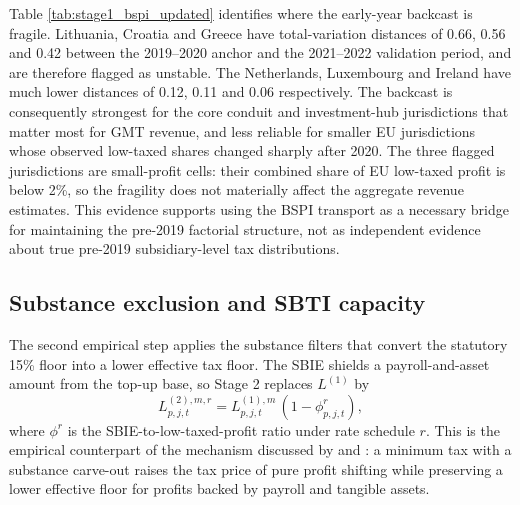 \documentclass[11pt,a4paper]{article}
\begin{document}


Table \ref{tab:stage1_bspi_updated} identifies where the early-year backcast is fragile. Lithuania, Croatia and Greece have total-variation distances of 0.66, 0.56 and 0.42 between the 2019--2020 anchor and the 2021--2022 validation period, and are therefore flagged as unstable. The Netherlands, Luxembourg and Ireland have much lower distances of 0.12, 0.11 and 0.06 respectively. The backcast is consequently strongest for the core conduit and investment-hub jurisdictions that matter most for GMT revenue, and less reliable for smaller EU jurisdictions whose observed low-taxed shares changed sharply after 2020. The three flagged jurisdictions are small-profit cells: their combined share of EU low-taxed profit is below 2\%, so the fragility does not materially affect the aggregate revenue estimates. This evidence supports using the BSPI transport as a necessary bridge for maintaining the pre-2019 factorial structure, not as independent evidence about true pre-2019 subsidiary-level tax distributions.

\subsection{Substance exclusion and SBTI capacity}\label{sec:results_stage2}

The second empirical step applies the substance filters that convert the statutory 15\% floor into a lower effective tax floor. The SBIE shields a payroll-and-asset amount from the top-up base, so Stage 2 replaces $L^{(1)}$ by
\begin{equation}\label{eq:results_stage2_liability}
L_{p,j,t}^{(2),m,r}
= L_{p,j,t}^{(1),m}\,(1-\phi_{p,j,t}^{r}),
\end{equation}
where $\phi^{r}$ is the SBIE-to-low-taxed-profit ratio under rate schedule $r$. This is the empirical counterpart of the mechanism discussed by \citet{devereux2023} and \citet{schjelderup2024}: a minimum tax with a substance carve-out raises the tax price of pure profit shifting while preserving a lower effective floor for profits backed by payroll and tangible assets.


\end{document}
